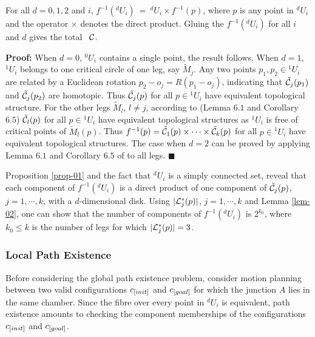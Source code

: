 \smallskip

\begin{Proposition}
\label{prop-01} \rm For all $d=0,1,2$ and $i$, $f^{-1}(^d\!U_i) \
= \ ^d\!U_i \times f^{-1}(p)$, where $p$ is any point in $^d\!U_i$
and the operator $\times$ denotes the direct product. Gluing the
$f^{-1}(^d\!U_i)$ for all $i$ and $d$ gives the total \cspace \
${\cal C}$.
\end{Proposition}

\medskip

{\bf Proof:} When $d=0$, ${}^0\!U_i$ contains a single point, the
result follows. When $d=1$, ${}^1\!U_i$ belongs to one critical
circle of one leg, say $\tilde M_j$. Any two points $p_1,p_2 \in
{}^1\!U_i$ are related by a Euclidean rotation $p_2-o_j =
R(p_1-o_j)$, indicating that $\tilde {\cal C}_j(p_1)$ and $\tilde
{\cal C}_j(p_2)$ are  homotopic. %
Thus $\tilde {\cal C}_j(p)$ for all $p \in {}^1\!U_i$ have
equivalent topological structure. For the other legs $\tilde M_l$,
$l \neq j$, according to \cite{MT1} (Lemma $6.1$ and
Corollary~$6.5$) $\tilde {\cal C}_l(p)$ for all $p \in {}^1\!U_i$
have equivalent topological structures as ${}^1\!U_i$ is free of
critical points of $\tilde M_l(p)$. Thus $f^{-1}(p) = \tilde {\cal
C}_1(p)\times \cdots \times \tilde {\cal C}_k(p)$ for all $p \in
{}^1\!U_i$ have equivalent topological structures. The case when
$d=2$ can be proved by applying Lemma $6.1$ and Corollary $6.5$ of
\cite{MT1} to all legs. \hfill$\blacksquare$

\medskip

Proposition \ref{prop-01} and the fact that ${}^d\!U_i$ is a
simply connected set, reveal that each component of
$f^{-1}({}^d\!U_i)$ is a direct product of one component of
${\tilde {\cal C}}_j(p)$, $j=1,\cdots,k$, with a $d$-dimensional
disk. Using $|{\cal L}_j^*(p)|$, $j=1,\cdots,k$ and Lemma
\ref{lem-02}, one can show that the number of components of
$f^{-1}({}^d\!U_i)$ is $2^{k_0}$, where $k_0 \leq k$ is the number
of legs for which $|{\cal L}_j^*(p)| = 3$.

\smallskip

\subsubsection{Local Path Existence}
Before considering the global path existence problem, consider
motion planning between two valid configurations $c_{\textit{\rm{[}}init]}$
and $c_{\textit{\rm{[}}goal]}$ for which the junction $A$ lies in the same
chamber. Since the fibre over every point in ${}^d\!U_i$ is
equivalent, path existence amounts to checking the component
memberships of the configurations $c_{\textit{\rm{[}}init]}$ and
$c_{\textit{\rm{[}}goal]}$.


